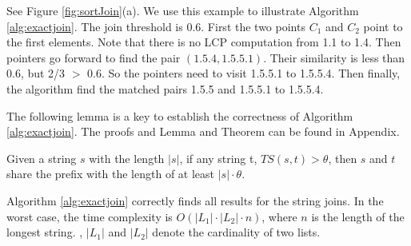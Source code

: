 \begin{example} See Figure \ref{fig:sortJoin}(a). We use this example to illustrate Algorithm \ref{alg:exactjoin}. The join threshold is 0.6. First the two points $C_1$ and $C_2$ point to the first elements. Note that there is no LCP computation from 1.1 to 1.4. Then pointers go forward to find the pair $(1.5.4, 1.5.5.1)$. Their similarity is less than 0.6, but 2/3 $>$ 0.6. So the pointers need to visit 1.5.5.1 to 1.5.5.4. Then finally, the algorithm find the matched pairs 1.5.5 and 1.5.5.1 to 1.5.5.4.  
\end{example}

The following lemma is a key to establish the correctness of Algorithm \ref{alg:exactjoin}. The proofs and Lemma and Theorem can be found in Appendix.

\begin{lem} Given a string $s$ with the length $|s|$, if any string t, $TS(s,t) > \theta$,  then $s$ and $t$ share the prefix with the length of at least $|s| \cdot \theta $.
\label{lemma:sortjoinlength}
\end{lem}

\begin{theorem} Algorithm \ref{alg:exactjoin} correctly finds all results for the string joins. In the worst case, the time complexity is  $O(|L_1| \cdot |L_2| \cdot n)$, where $n$ is the length of the longest string. \label{theo:sortedjoin}, $|L_1|$ and $|L_2|$ denote the cardinality of two lists.
\end{theorem}




